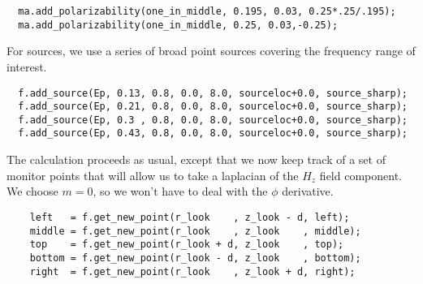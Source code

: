 \begin{verbatim}
  ma.add_polarizability(one_in_middle, 0.195, 0.03, 0.25*.25/.195);
  ma.add_polarizability(one_in_middle, 0.25, 0.03,-0.25);
\end{verbatim}

\begin{comment}
  ma.output_slices();

  fields f(&ma, m);
\end{comment}

For sources, we use a series of broad point sources covering the frequency
range of interest.

\begin{verbatim}
  f.add_source(Ep, 0.13, 0.8, 0.0, 8.0, sourceloc+0.0, source_sharp);
  f.add_source(Ep, 0.21, 0.8, 0.0, 8.0, sourceloc+0.0, source_sharp);
  f.add_source(Ep, 0.3 , 0.8, 0.0, 8.0, sourceloc+0.0, source_sharp);
  f.add_source(Ep, 0.43, 0.8, 0.0, 8.0, sourceloc+0.0, source_sharp);
\end{verbatim}
\begin{comment}
  printf("Working with a=%
  monitor_point *left = NULL, *right = NULL, *middle = NULL,
                *top = NULL, *bottom = NULL;
  double next_printtime = 10;
  while (f.time() < 110 && !interrupt) {
    if (f.time() >= next_printtime) {
      next_printtime += 10;
      printf("Working on time %
      printf("energy is %
      if (f.time() > -90) f.output_slices();
    }
    f.step();
\end{comment}

The calculation proceeds as usual, except that we now keep track of a set
of monitor points that will allow us to take a laplacian of the $H_z$ field
component.  We choose $m=0$, so we won't have to deal with the $\phi$
derivative.

\begin{verbatim}
    left   = f.get_new_point(r_look    , z_look - d, left);
    middle = f.get_new_point(r_look    , z_look    , middle);
    top    = f.get_new_point(r_look + d, z_look    , top);
    bottom = f.get_new_point(r_look - d, z_look    , bottom);
    right  = f.get_new_point(r_look    , z_look + d, right);
\end{verbatim}
\begin{comment}
  }

  grace g("eps", dirname);
  complex<double> *al, *ar, *am, *at, *ab, *freqs;
  int numl, numr;
  printf("Working on left fourier transform...\n");
\end{comment}

